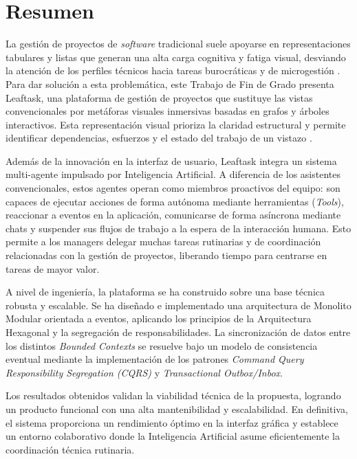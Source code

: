 \chapter*{Resumen}

La gestión de proyectos de \emph{software} tradicional suele apoyarse en representaciones tabulares y listas que generan una alta carga cognitiva y fatiga visual, desviando la atención de los perfiles técnicos hacia tareas burocráticas y de microgestión \cite{meyer2019today}. Para dar solución a esta problemática, este Trabajo de Fin de Grado presenta Leaftask, una plataforma de gestión de proyectos que sustituye las vistas convencionales por metáforas visuales inmersivas basadas en grafos y árboles interactivos. Esta representación visual prioriza la claridad estructural y permite identificar dependencias, esfuerzos y el estado del trabajo de un vistazo \cite{ghoniem2004comparison}.

Además de la innovación en la interfaz de usuario, Leaftask integra un sistema multi-agente impulsado por Inteligencia Artificial. A diferencia de los asistentes convencionales, estos agentes operan como miembros proactivos del equipo: son capaces de ejecutar acciones de forma autónoma mediante herramientas (\emph{Tools}), reaccionar a eventos en la aplicación, comunicarse de forma asíncrona mediante chats y suspender sus flujos de trabajo a la espera de la interacción humana. Esto permite a los managers delegar muchas tareas rutinarias y de coordinación relacionadas con la gestión de proyectos, liberando tiempo para centrarse en tareas de mayor valor.

A nivel de ingeniería, la plataforma se ha construido sobre una base técnica robusta y escalable. Se ha diseñado e implementado una arquitectura de Monolito Modular orientada a eventos, aplicando los principios de la Arquitectura Hexagonal \cite{cockburn2005hexagonal} y la segregación de responsabilidades. La sincronización de datos entre los distintos \emph{Bounded Contexts} \cite{evans2004ddd} se resuelve bajo un modelo de consistencia eventual mediante la implementación de los patrones \emph{Command Query Responsibility Segregation (CQRS)} y \emph{Transactional Outbox/Inbox}.

Los resultados obtenidos validan la viabilidad técnica de la propuesta, logrando un producto funcional con una alta mantenibilidad y escalabilidad. En definitiva, el sistema proporciona un rendimiento óptimo en la interfaz gráfica y establece un entorno colaborativo donde la Inteligencia Artificial asume eficientemente la coordinación técnica rutinaria.